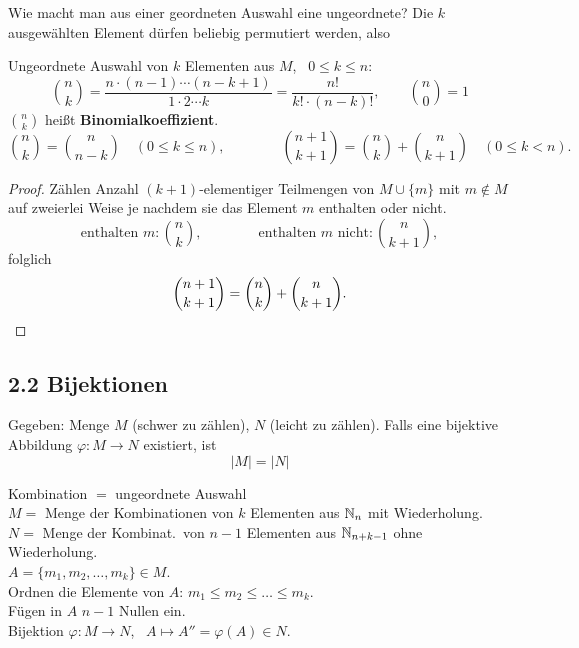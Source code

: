 Wie macht man aus einer geordneten Auswahl eine ungeordnete?
Die $k$ ausgewählten Element dürfen beliebig permutiert werden, also

\begin{definition}[Kombinationen]
Ungeordnete Auswahl von $k$ Elementen aus $M$, \ $0 \le k \le n$:
\[
\binom{n}{k} = \frac{n \cdot (n-1)\cdots(n-k+1)}{1\cdot 2\cdots k} = \frac{n!}{k! \cdot (n-k)!}, \qquad \binom{n}{0} = 1
\]
$\binom{n}{k}$ heißt \textbf{Binomialkoeffizient}.
\[
\binom{n}{k} = \binom{n}{n-k} \quad (0 \le k \le n), \qquad\qquad \binom{n+1}{k+1} = \binom{n}{k} + \binom{n}{k+1} \quad (0 \le k < n).
\]
\end{definition}

\begin{proof}
Zählen Anzahl $(k+1)$-elementiger Teilmengen von $M \cup \{m\}$ mit $m \notin M$ auf zweierlei Weise je nachdem sie das Element $m$ enthalten oder nicht.
\[
\text{enthalten } m: \binom{n}{k}, \qquad\qquad \text{enthalten } m \text{ nicht}: \binom{n}{k+1},
\]
folglich
\[
\binom{n+1}{k+1} = \binom{n}{k} + \binom{n}{k+1}. \qedhere
\]
\end{proof}

\subsection{2.2 Bijektionen}

Gegeben: Menge $M$ (schwer zu zählen), $N$ (leicht zu zählen).
Falls eine bijektive Abbildung $\varphi : M \to N$ existiert, ist
\begin{equation*}
|M| = |N| \tag{$*$}
\end{equation*}

\begin{satz}
Kombination $=$ ungeordnete Auswahl\\
$M =$ Menge der Kombinationen von $k$ Elementen aus $\mathbb{N}_n$ mit Wiederholung.\\
$N =$ Menge der Kombinat.\ von $n-1$ Elementen aus $\mathbb{N}_{n+k-1}$ ohne Wiederholung.\\
$A = \{ m_1, m_2, \dots, m_k \} \in M$.\\
Ordnen die Elemente von $A$: \quad $m_1 \le m_2 \le \dots \le m_k$.\\
Fügen in $A$ $n-1$ Nullen ein.\\
Bijektion $\varphi : M \to N$, \ $A \mapsto A'' = \varphi(A) \in N$.
\end{satz}

